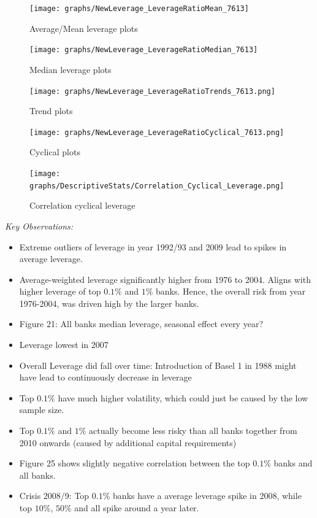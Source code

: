 \documentclass[12pt, a4paper]{article} %
\begin{document}
\iffalse

\begin{figure}[hbtp]
\centering
\caption{Average/Mean leverage plots}
\texttt{[image: graphs/NewLeverage\_LeverageRatioMean\_7613]}
\end{figure}


\begin{figure}[hbtp]
\centering
\caption{Median leverage plots}
\texttt{[image: graphs/NewLeverage\_LeverageRatioMedian\_7613]}
\end{figure}



\begin{figure}[hbtp]
\centering
\caption{Trend plots}
\texttt{[image: graphs/NewLeverage\_LeverageRatioTrends\_7613.png]}
\end{figure}



\begin{figure}[hbtp]
\centering
\caption{Cyclical plots}
\texttt{[image: graphs/NewLeverage\_LeverageRatioCyclical\_7613.png]}
\end{figure}



\begin{figure}[hbtp]
\centering
\caption{Correlation cyclical leverage}
\texttt{[image: graphs/DescriptiveStats/Correlation\_Cyclical\_Leverage.png]}
\end{figure}


\noindent \textit{Key Observations:}
\begin{itemize}
\item Extreme outliers of leverage in year 1992/93 and 2009 lead to spikes in average leverage.
\item Average-weighted leverage significantly higher from 1976 to 2004. Aligns with higher leverage of top $0.1\%$ and $1\%$ banks. Hence, the overall risk from year 1976-2004, was driven high by the larger banks. 
\item Figure 21: All banks median leverage, seasonal effect every year?
\item Leverage lowest in 2007
\item Overall Leverage did fall over time: Introduction of Basel 1 in 1988 might have lead to continuously decrease in leverage
\item Top $0.1\%$ have much higher volatility, which could just be caused by the low sample size.
\item Top $0.1\%$ and $1\%$ actually become less risky than all banks together from 2010 onwards (caused by additional capital requirements)
\item Figure 25 shows slightly negative correlation between the top $0.1\%$ banks and all banks. 
\item Crisis 2008/9: Top $0.1\%$ banks have a average leverage spike in 2008, while top $10\%$, $50\%$ and all  spike around a year later.  
\end{itemize}
\end{document}
